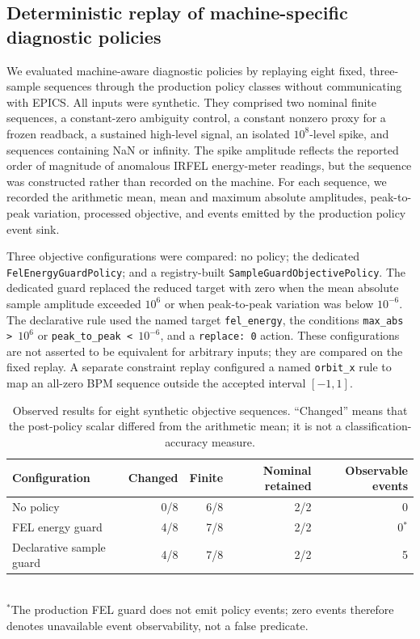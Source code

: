 \subsection{Deterministic replay of machine-specific diagnostic policies}
\label{sec:policy_replay}

We evaluated machine-aware diagnostic policies by replaying eight fixed,
three-sample sequences through the production policy classes without
communicating with EPICS.  All inputs were synthetic.  They comprised two
nominal finite sequences, a constant-zero ambiguity control, a constant
nonzero proxy for a frozen readback, a sustained high-level signal, an isolated
$10^8$-level spike, and sequences containing NaN or infinity.  The spike
amplitude reflects the reported order of magnitude of anomalous IRFEL
energy-meter readings, but the sequence was constructed rather than recorded
on the machine.  For each sequence, we recorded the arithmetic mean, mean and
maximum absolute amplitudes, peak-to-peak variation, processed objective, and
events emitted by the production policy event sink.

Three objective configurations were compared: no policy; the dedicated
\texttt{FelEnergyGuardPolicy}; and a registry-built
\texttt{SampleGuardObjectivePolicy}.  The dedicated guard replaced the reduced
target with zero when the mean absolute sample amplitude exceeded $10^6$ or
when peak-to-peak variation was below $10^{-6}$.  The declarative rule used the
named target \texttt{fel\_energy}, the conditions
\texttt{max\_abs > $10^6$} or \texttt{peak\_to\_peak < $10^{-6}$}, and a
\texttt{replace: 0} action.  These configurations are not asserted to be
equivalent for arbitrary inputs; they are compared on the fixed replay.  A
separate constraint replay configured a named \texttt{orbit\_x} rule to map an
all-zero BPM sequence outside the accepted interval $[-1,1]$.

\begin{table}[t]
\centering
\caption{Observed results for eight synthetic objective sequences.  ``Changed''
means that the post-policy scalar differed from the arithmetic mean; it is not
a classification-accuracy measure.}
\label{tab:policy-replay}
\begin{tabular}{lrrrr}
\hline
Configuration & Changed & Finite & Nominal retained & Observable events \\
\hline
No policy & 0/8 & 6/8 & 2/2 & 0 \\
FEL energy guard & 4/8 & 7/8 & 2/2 & 0$^{\ast}$ \\
Declarative sample guard & 4/8 & 7/8 & 2/2 & 5 \\
\hline
\end{tabular}
\\[-1mm]
\footnotesize{$^{\ast}$The production FEL guard does not emit policy events; zero
events therefore denotes unavailable event observability, not a false
predicate.}
\end{table}

